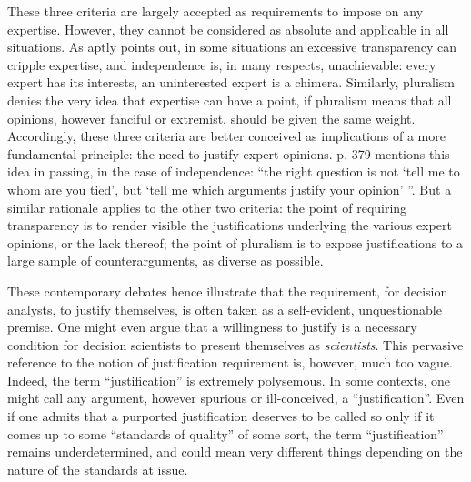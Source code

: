 \documentclass[preprint, french, english, 11pt, authoryear]{elsarticle}%
\begin{document}
These three criteria are largely accepted as requirements to impose on any expertise. However, they cannot be considered as absolute and applicable in all situations. As \citet{godard_environnement_2015} aptly points out, in some situations an excessive transparency can cripple expertise, and independence is, in many respects, unachievable: every expert has its interests, an uninterested expert is a chimera. Similarly, pluralism denies the very idea that expertise can have a point, if pluralism means that all opinions, however fanciful or extremist, should be given the same weight. Accordingly, these three criteria are better conceived as implications of a more fundamental principle: the need to justify expert opinions. \citet{godard_environnement_2015} p. 379 mentions this idea in passing, in the case of independence: “the right question is not `tell me to whom are you tied', but `tell me which arguments justify your opinion' ”. But a similar rationale applies to the other two criteria: the point of requiring transparency is to render visible the justifications underlying the various expert opinions, or the lack thereof; the point of pluralism is to expose justifications to a large sample of counterarguments, as diverse as possible.

These contemporary debates hence illustrate that the requirement, for decision analysts, to justify themselves, is often taken as a self-evident, unquestionable premise. One might even argue that a willingness to justify is a necessary condition for decision scientists to present themselves as \emph{scientists}. This pervasive reference to the notion of justification requirement is, however, much too vague. Indeed, the term ``justification'' is extremely polysemous. In some contexts, one might call any argument, however spurious or ill-conceived, a ``justification''. Even if one admits that a purported justification deserves to be called so only if it comes up to some ``standards of quality'' of some sort, the term ``justification'' remains underdetermined, and could mean very different things depending on the nature of the standards at issue.
\end{document}
